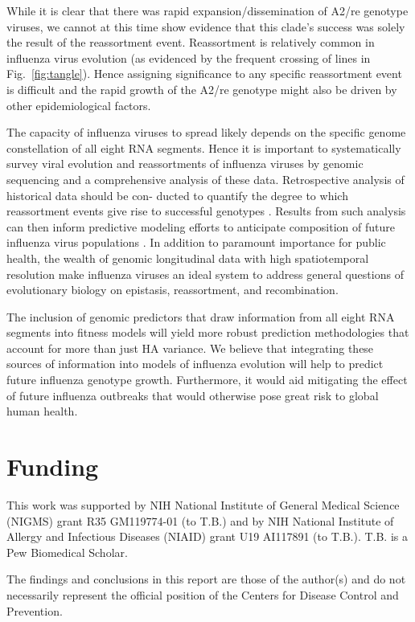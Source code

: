While it is clear that there was rapid expansion/dissemination of A2/re genotype viruses, we cannot at this time show evidence that this clade’s success was solely the result of the reassortment event.
Reassortment is relatively common in influenza virus evolution (as evidenced by the frequent crossing of lines in Fig.~\ref{fig:tangle}).
Hence assigning significance to any specific reassortment event is difficult and the rapid growth of the A2/re genotype might also be driven by other epidemiological factors.

The capacity of influenza viruses to spread likely depends on the specific genome constellation of all eight RNA segments.
Hence it is important to systematically survey viral evolution and reassortments of influenza viruses by genomic sequencing and a comprehensive analysis of these data.
Retrospective analysis of historical data should be con- ducted to quantify the degree to which reassortment events give rise to successful genotypes \citep{nelson_multiple_2008, dudas_reassortment_2015, villa_fitness_2017}.
Results from such analysis can then inform predictive modeling efforts to anticipate composition of future influenza virus populations \citep{luksza_predictive_2014, neher_predicting_2014, morris_predictive_2017, klingen_silico_2018}.
In addition to paramount importance for public health, the wealth of genomic longitudinal data with high spatiotemporal resolution make influenza viruses an ideal system to address general questions of evolutionary biology on epistasis, reassortment, and recombination.

The inclusion of genomic predictors that draw information from all eight RNA segments into fitness models will yield more robust prediction methodologies that account for more than just HA variance.
We believe that integrating these sources of information into models of influenza evolution will help to predict future influenza genotype growth.
Furthermore, it would aid mitigating the effect of future influenza outbreaks that would otherwise pose great risk to global human health.

\section*{Funding}
This work was supported by NIH National Institute of General Medical Science (NIGMS) grant R35 GM119774-01 (to T.B.) and by NIH National Institute of Allergy and Infectious Diseases (NIAID) grant U19 AI117891 (to T.B.). T.B. is a Pew Biomedical Scholar.

The findings and conclusions in this report are those of the author(s) and do not necessarily represent the official position of the Centers for Disease Control and Prevention.
